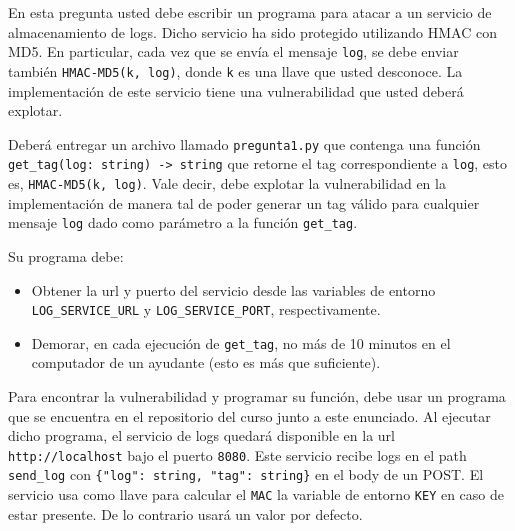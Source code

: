 
En esta pregunta usted debe escribir un programa para atacar a un servicio de almacenamiento de logs. Dicho servicio ha sido protegido utilizando HMAC con MD5.
En particular, cada vez que se envía el mensaje \texttt{log}, se debe enviar también \texttt{HMAC-MD5(k, log)}, donde \texttt{k} es una llave que usted desconoce. La implementación de este servicio tiene una vulnerabilidad que usted deberá explotar.

Deberá entregar un archivo llamado \texttt{pregunta1.py} que contenga una función \texttt{get\_tag(log: string) -> string} que retorne el tag correspondiente a \texttt{log}, esto es, \texttt{HMAC-MD5(k, log)}. Vale decir, debe explotar la vulnerabilidad en la implementación de manera tal de poder generar un tag válido para cualquier mensaje \texttt{log} dado como parámetro a la función \texttt{get\_tag}.

Su programa debe:
\begin{itemize}
  \item Obtener la url y puerto del servicio desde las variables de entorno \texttt{LOG\_SERVICE\_URL} y \texttt{LOG\_SERVICE\_PORT}, respectivamente.
  \item Demorar, en cada ejecución de \texttt{get\_tag}, no más de 10 minutos en el computador de un ayudante (esto es más que suficiente).
\end{itemize}

Para encontrar la vulnerabilidad y programar su función, debe usar un programa que se encuentra en el repositorio del curso junto a este enunciado. Al ejecutar dicho programa, el servicio de logs quedará disponible en la url \texttt{http://localhost} bajo el puerto \texttt{8080}. Este servicio recibe logs en el path \texttt{send\_log} con \texttt{\{"log": string, "tag": string\}} en el body de un POST. El servicio usa como llave para calcular el \texttt{MAC} la variable de entorno \texttt{KEY} en caso de estar presente. De lo contrario usará un valor por defecto. 

